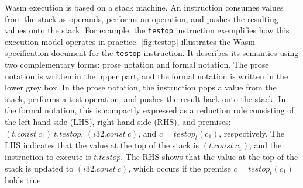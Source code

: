 Wasm execution is based on a stack machine.
An instruction consumes values from the stack as operands, performs an
operation, and pushes the resulting values onto the stack.
For example, the \texttt{testop} instruction exemplifies how this execution
model operates in practice.
\cref{fig:testop} illustrates the Wasm specification document for the
\texttt{testop} instruction.
It describes its semantics using two complementary forms: prose notation and
formal notation.
The prose notation is written in the upper part, and the formal notation is
written in the lower grey box.
In the prose notation, the instruction pops a value from the stack, performs a
test operation, and pushes the result back onto the stack.
In the formal notation, this is compactly expressed as a reduction rule
consisting of the left-hand side (LHS), right-hand side (RHS), and premises:
$(t.const ~ c_1) ~ t.testop$, $(i32.const ~ c)$, and $c = testop_t(c_1)$,
respectively.
The LHS indicates that the value at the top of the stack is $(t.const ~ c_1)$,
and the instruction to execute is $t.testop$.
The RHS shows that the value at the top of the stack is updated to $(i32.const
~ c)$, which occurs if the premise $c = testop_t(c_1)$ holds true.


